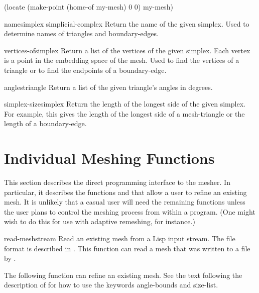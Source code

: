 \begin{code}
(locate (make-point (home-of my-mesh) 0 0) my-mesh)
\end{code}

\begin{functiondef}{name}{simplex simplicial-complex}
Return the name of the given simplex.  Used to determine names of
triangles and boundary-edges.
\end{functiondef}

\begin{methoddef}{vertices-of}{simplex}
Return a list of the vertices of the given simplex.  Each vertex is a
point in the embedding space of the mesh.  
Used to find the vertices of a triangle
or to find the endpoints of a boundary-edge.
\end{methoddef}

\begin{functiondef}{angles}{triangle}
Return a list of the given triangle's angles in degrees.
\end{functiondef}

\begin{functiondef}{simplex-size}{simplex}
Return the length of the longest side of the given simplex.  For
example, this gives the length of the longest side of a mesh-triangle
or the length of a boundary-edge.
\end{functiondef}


\section{Individual Meshing Functions}
\label{MeshingFunctions:Sec}

This section describes the direct programming interface to the mesher.
In particular, it describes the functions  and
 that allow a user to refine an existing mesh.
It is 
unlikely that a casual user will need the remaining functions unless
the user plans to control the meshing process from within a program.
(One might wish to do this for use with adaptive remeshing, for
instance.)

\begin{functiondef}{read-mesh}{stream}
Read an existing mesh from a Lisp input stream.  The file format is
described in .  This function can read a mesh that
was written to a file by .
\end{functiondef}

The following function can refine an existing mesh.  See the text
following the description of  for how to use the
keywords angle-bounds and size-list.

